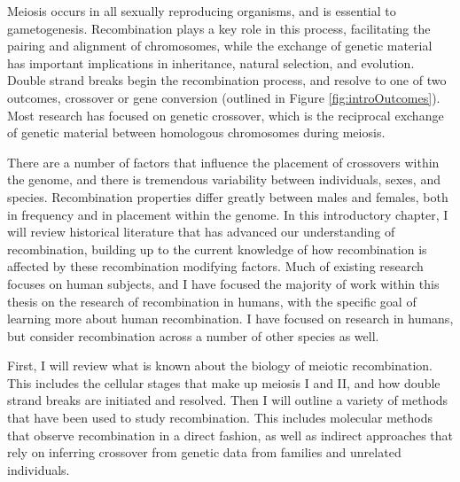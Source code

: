 

Meiosis occurs in all sexually reproducing organisms, and is essential to gametogenesis.
Recombination plays a key role in this process, facilitating the pairing and alignment of chromosomes, while the exchange of genetic material has important implications in inheritance, natural selection, and evolution.
Double strand breaks begin the recombination process, and resolve to one of two outcomes, crossover or gene conversion (outlined in Figure \ref{fig:introOutcomes}).
Most research  has focused on genetic crossover, which is the reciprocal exchange of genetic material between homologous chromosomes during meiosis.

There are a number of factors that influence the placement of crossovers within the genome, and there is tremendous variability between individuals, sexes, and species.
Recombination properties differ greatly between males and females, both in frequency and in placement within the genome.
%
In this introductory chapter, I will review historical literature that has advanced our understanding of recombination, building up to the current knowledge of how recombination is affected by these recombination modifying factors.
Much of existing research focuses on human subjects, and I have focused the majority of work within this thesis on the research of recombination in humans, with the specific goal of learning more about human recombination.
I have focused on research in humans, but consider recombination across a number of other species as well.

First, I will review what is known about the biology of meiotic recombination.
This includes the cellular stages that make up meiosis I and II, and how double strand breaks are initiated and resolved. %
Then I will outline a variety of methods that have been used to study recombination.
This includes molecular methods that observe recombination in a direct fashion, as well as indirect approaches that rely on inferring crossover from genetic data from families and unrelated individuals.


